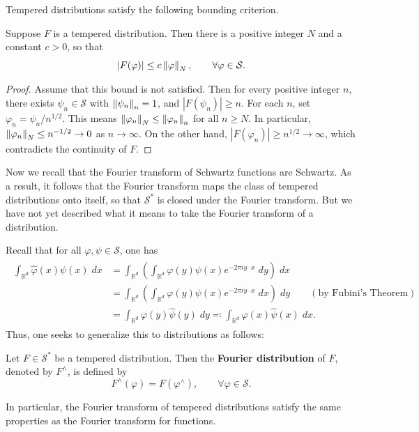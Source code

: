 \documentclass{article}
\begin{document}
Tempered distributions satisfy the following bounding criterion. 

\begin{prop}
	Suppose $F$ is a tempered distribution. Then there is a positive integer $N$ and a constant $c > 0$, so that 
	\begin{equation*}
		|F(\varphi)| \leq c\left\Vert \varphi \right\Vert_{N}, \qquad \forall \varphi \in \mathcal{S}. 
	\end{equation*}
\end{prop} 
\begin{proof}
Assume that this bound is not satisfied. Then for every positive integer $n$, there exists $\psi_{n} \in \mathcal{S}$ with $\left\Vert \psi_{n} \right\Vert_{n} = 1$, and $|F(\psi_{n})| \geq n$. For each $n$, set $\varphi_{n}= \psi_{n}/n^{1/2}$. This means $\left\Vert \varphi_{n} \right\Vert_{N} \leq \left\Vert \varphi_{n} \right\Vert_{n}$ for all $n \geq N$. 
In particular, $\left\Vert \varphi_{n} \right\Vert_{N} \leq n^{-1/2} \to 0$ as $n \to \infty$. On the other hand, $|F(\varphi_{n})| \geq n^{1/2} \to \infty$, which contradicts the continuity of $F$. 
\end{proof} 

Now we recall that the Fourier transform of Schwartz functions are Schwartz. As a result, it follows that the Fourier transform maps the class of tempered distributions onto itself, so that $\mathcal{S}^{\ast}$ is closed under the Fourier transform. But we have not yet described what it means to take the Fourier transform of a distribution. 

Recall that for all $\varphi, \psi \in \mathcal{S}$, one has 
\begin{align*}
	\begin{split}
		\int_{\mathbb{R}^{d}}\hat{\varphi}(x)\psi(x)\;dx &= \int_{\mathbb{R}^{d}}\left(\int_{\mathbb{R}^{d}}\varphi(y)\psi(x)e^{-2\pi iy \cdot x}\;dy\right)\;dx \\
		&= \int_{\mathbb{R}^{d}}\left(\int_{\mathbb{R}^{d}}\varphi(y)\psi(x)e^{-2\pi i y \cdot x}\;dx\right)\;dy \qquad (\text{by Fubini's Theorem}) \\
		&= \int_{\mathbb{R}^{d}}\varphi(y)\hat{\psi}(y)\;dy \eqqcolon \int_{\mathbb{R}^{d}}\varphi(x)\hat{\psi}(x)\;dx. 
	\end{split} 
\end{align*}
Thus, one seeks to generalize this to distributions as follows: 
\begin{definition}
	Let $F \in \mathcal{S}^{\ast}$ be a tempered distribution. Then the \textbf{Fourier distribution} of $F$, denoted by $F^{\wedge}$, is defined by 
	\begin{equation*}
		F^{\wedge}(\varphi) = F(\varphi^{\wedge}), \qquad \forall \varphi \in \mathcal{S}. 
	\end{equation*}
\end{definition} 
In particular, the Fourier transform of tempered distributions satisfy the same properties as the Fourier transform for functions. 
\end{document}
